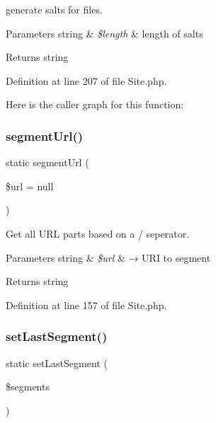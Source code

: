 generate salts for files.


\begin{DoxyParams}[1]{Parameters}
string & {\em \$length} & length of salts\\
\hline
\end{DoxyParams}
\begin{DoxyReturn}{Returns}
string 
\end{DoxyReturn}


Definition at line 207 of file Site.\+php.

Here is the caller graph for this function\+:
\mbox{\label{class_zest_1_1_site_1_1_site_a0f6ab5f2dc1ad4b3ef7ca9251e63c777}} 
\subsubsection{\texorpdfstring{segment\+Url()}{segmentUrl()}}
{\footnotesize\ttfamily static segment\+Url (\begin{DoxyParamCaption}\item[{}]{\$url = {\ttfamily null} }\end{DoxyParamCaption})\hspace{0.3cm}{\ttfamily [static]}}

Get all U\+RL parts based on a / seperator.


\begin{DoxyParams}[1]{Parameters}
string & {\em \$url} & → U\+RI to segment\\
\hline
\end{DoxyParams}
\begin{DoxyReturn}{Returns}
string 
\end{DoxyReturn}


Definition at line 157 of file Site.\+php.

\mbox{\label{class_zest_1_1_site_1_1_site_a3ffc4def9857eea2fbffd7c7c9b3de20}} 
\subsubsection{\texorpdfstring{set\+Last\+Segment()}{setLastSegment()}}
{\footnotesize\ttfamily static set\+Last\+Segment (\begin{DoxyParamCaption}\item[{}]{\$segments }\end{DoxyParamCaption})\hspace{0.3cm}{\ttfamily [static]}}

